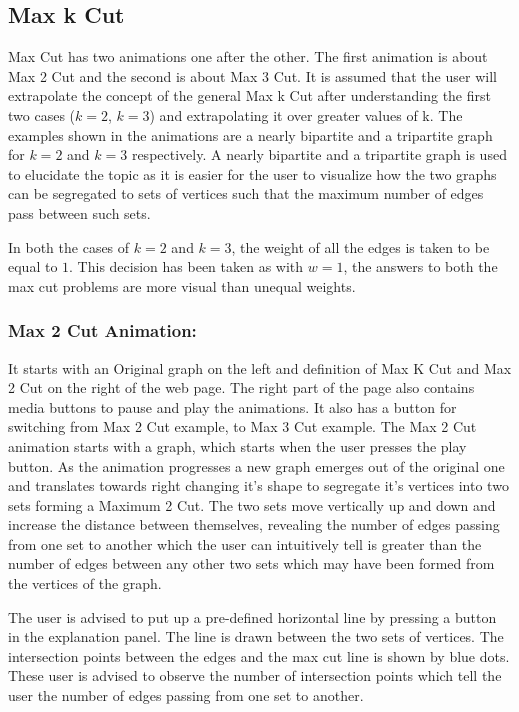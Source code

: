 \subsection{Max k Cut}
\label{story: maxkcut}
Max Cut has two animations one after the other.  The first animation is about
Max 2 Cut and the second is about Max 3 Cut.  It is assumed that the user will
extrapolate the concept of the general Max k Cut after understanding the first
two cases ($k=2$, $k=3$) and extrapolating it over greater values of k.  The
examples shown in the animations are a nearly bipartite and a tripartite graph
for $k=2$ and $k=3$ respectively.  A nearly bipartite and a tripartite graph is
used to elucidate the topic as it is easier for the user to visualize how the
two graphs can be segregated to sets of vertices such that the maximum number
of edges pass between such sets.

In both the cases of $k=2$ and $k=3$, the weight of all the edges is taken to
be equal to $1$. This decision has been taken as with $w=1$, the answers to
both the max cut problems are more visual than unequal weights.

\subsubsection{Max 2 Cut Animation:} 
\label{story: max2cut}
It starts with an Original graph on the left and definition of Max K Cut and
Max 2 Cut on the right of the web page. The right part of the page also
contains media buttons to pause and play the animations. It also has a button
for switching from Max 2 Cut example, to Max 3 Cut example.  The Max 2 Cut
animation starts with a graph, which starts when the user presses the play
button. As the animation progresses a new graph emerges out of the original
one and translates towards right changing it's shape to segregate it's
vertices into two sets forming a Maximum 2 Cut. The two sets move vertically up
and down and increase the distance between themselves, revealing the
number of edges passing from one set to another which the user can intuitively
tell is greater than the number of edges between any other two sets
which may have been formed from the vertices of the graph.

The user is advised to put up a pre-defined horizontal line by pressing a
button in the explanation panel. The line is drawn between the two sets of
vertices.  The intersection points between the edges and the max cut line is
shown by blue dots. These user is advised to observe the number of intersection
points which tell the user the number of edges passing from one set to another.

